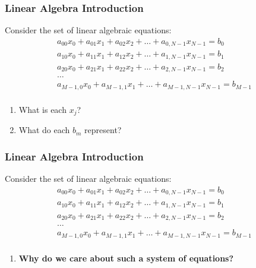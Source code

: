 \documentclass[12pt]{beamer}
\newcommand{\FrameTitle}[2]{\frametitle{#1 \hfill \small\textnormal{\textcolor{midgray}{#2}}}}
\begin{document}
\begin{frame}\FrameTitle{Linear Algebra}{Introduction}
    Consider the set of linear algebraic equations:
    \begin{align*}
        a_{00}x_0 + a_{01}x_1 + a_{02}x_2 + \ldots + a_{0,N-1}x_{N-1} = b_0\\
        a_{10}x_0 + a_{11}x_1 + a_{12}x_2 + \ldots + a_{1,N-1}x_{N-1} = b_1\\
        a_{20}x_0 + a_{21}x_1 + a_{22}x_2 + \ldots + a_{2,N-1}x_{N-1} = b_2\\
        \ldots\\
        a_{M-1,0}x_0 + a_{M-1,1}x_1 + \ldots + a_{M-1,N-1}x_{N-1} = b_{M-1}\\
    \end{align*}

    \vspace*{-1em}{\Large\textbf{\color{question}{Quiz:}}}\vspace*{6pt}
    \begin{enumerate}
        \item[4.] What is each $x_j$?
        \item[5.] What do each $b_m$ represent?
    \end{enumerate}
\end{frame}

\begin{frame}\FrameTitle{Linear Algebra}{Introduction}
    Consider the set of linear algebraic equations:
    \begin{align*}
        a_{00}x_0 + a_{01}x_1 + a_{02}x_2 + \ldots + a_{0,N-1}x_{N-1} = b_0\\
        a_{10}x_0 + a_{11}x_1 + a_{12}x_2 + \ldots + a_{1,N-1}x_{N-1} = b_1\\
        a_{20}x_0 + a_{21}x_1 + a_{22}x_2 + \ldots + a_{2,N-1}x_{N-1} = b_2\\
        \ldots\\
        a_{M-1,0}x_0 + a_{M-1,1}x_1 + \ldots + a_{M-1,N-1}x_{N-1} = b_{M-1}\\
    \end{align*}

    \vspace*{-1em}{\Large\textbf{\color{question}{Quiz:}}}\vspace*{6pt}
    \begin{enumerate}
        \item[6.] \textbf{Why do we care about such a system of equations?}
    \end{enumerate}
\end{frame}
\end{document}
